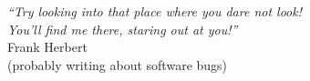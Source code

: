 \cleardoublepage
\thispagestyle{plain}

\vspace*{8cm}

\begin{flushright}
  \textsl{``Try looking into that place where you dare not look!\\
  You'll find me there, staring out at you!''}\\
\vspace*{0.8cm}
    Frank Herbert \\
    (probably writing about software bugs)
\end{flushright}
